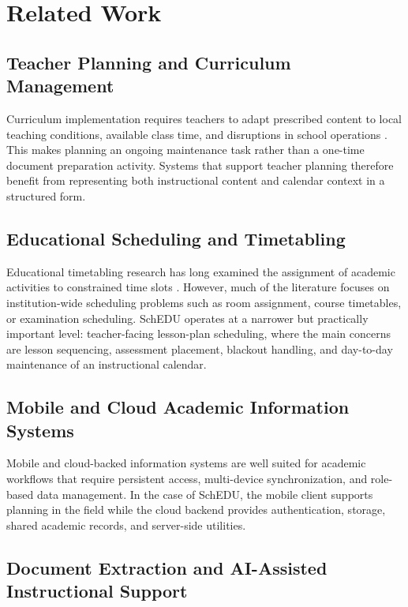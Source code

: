\documentclass[conference]{IEEEtran}
\begin{document}
\section{Related Work}

\subsection{Teacher Planning and Curriculum Management}

Curriculum implementation requires teachers to adapt prescribed content to local
teaching conditions, available class time, and disruptions in school operations
\cite{pak2020}. This makes planning an ongoing maintenance task rather than a
one-time document preparation activity. Systems that support teacher planning
therefore benefit from representing both instructional content and calendar context
in a structured form.

\subsection{Educational Scheduling and Timetabling}

Educational timetabling research has long examined the assignment of academic
activities to constrained time slots \cite{schaerf1999}. However, much of the
literature focuses on institution-wide scheduling problems such as room assignment,
course timetables, or examination scheduling. SchEDU operates at a narrower but
practically important level: teacher-facing lesson-plan scheduling, where the main
concerns are lesson sequencing, assessment placement, blackout handling, and
day-to-day maintenance of an instructional calendar.

\subsection{Mobile and Cloud Academic Information Systems}

Mobile and cloud-backed information systems are well suited for academic workflows
that require persistent access, multi-device synchronization, and role-based data
management. In the case of SchEDU, the mobile client supports planning in the field
while the cloud backend provides authentication, storage, shared academic records,
and server-side utilities.

\subsection{Document Extraction and AI-Assisted Instructional Support}
\end{document}

